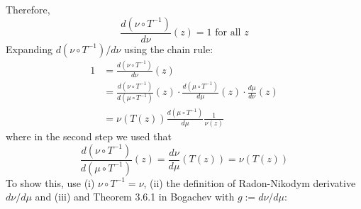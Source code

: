 \documentclass[twoside]{article}
\begin{document}
Therefore,
\[
\frac{d (\nu \circ T^{-1})}{d \nu}(z) = 1 \mbox{ for all } z
\]
Expanding $d(\nu \circ T^{-1}) / d \nu$ using the chain rule:
\begin{align}
1 &= \frac{d (\nu \circ T^{-1})}{d \nu}(z)\\
&=   \frac{d (\nu \circ T^{-1})}{d (\mu \circ T^{-1})}(z) \cdot
    \frac{d (\mu \circ T^{-1})}{d \mu}(z) \cdot
    \frac{d \mu}{d \nu}(z)\\
&= \nu(T(z))  \frac{d (\mu \circ T^{-1})}{d \mu} \frac{1}{\nu(z)}
\end{align}
where in the second step we used that
\[
\frac{d (\nu \circ T^{-1})}{d (\mu \circ T^{-1})}(z) = \frac{d \nu}{d \mu}(T(z)) = \nu(T(z))
\]
To show this, use (i) $\nu \circ T^{-1} = \nu$, (ii) the definition of Radon-Nikodym derivative $d \nu / d \mu$ and (iii) and Theorem 3.6.1 in Bogachev with $g := d\nu / d\mu$:
\end{document}
